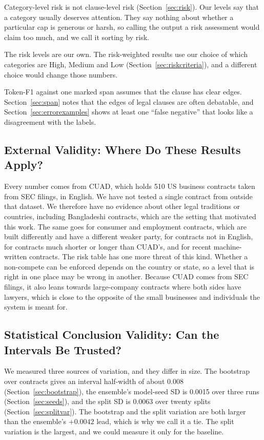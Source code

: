 Category-level risk is not clause-level risk (Section~\ref{sec:risk}). Our levels say that a category usually deserves attention. They say nothing about whether a particular cap is generous or harsh, so calling the output a risk assessment would claim too much, and we call it sorting by risk.

The risk levels are our own. The risk-weighted results use our choice of which categories are High, Medium and Low (Section~\ref{sec:riskcriteria}), and a different choice would change those numbers.

Token-F1 against one marked span assumes that the clause has clear edges. Section~\ref{sec:span} notes that the edges of legal clauses are often debatable, and Section~\ref{sec:errorexamples} shows at least one ``false negative'' that looks like a disagreement with the labels.

\subsection{External Validity: Where Do These Results Apply?}
Every number comes from CUAD, which holds 510 US business contracts taken from SEC filings, in English. We have not tested a single contract from outside that dataset. We therefore have no evidence about other legal traditions or countries, including Bangladeshi contracts, which are the setting that motivated this work. The same goes for consumer and employment contracts, which are built differently and have a different weaker party, for contracts not in English, for contracts much shorter or longer than CUAD's, and for recent machine-written contracts. The risk table has one more threat of this kind. Whether a non-compete can be enforced depends on the country or state, so a level that is right in one place may be wrong in another. Because CUAD comes from SEC filings, it also leans towards large-company contracts where both sides have lawyers, which is close to the opposite of the small businesses and individuals the system is meant for.

\subsection{Statistical Conclusion Validity: Can the Intervals Be Trusted?}
We measured three sources of variation, and they differ in size. The bootstrap over contracts gives an interval half-width of about 0.008 (Section~\ref{sec:bootstrap}), the ensemble's model-seed SD is 0.0015 over three runs (Section~\ref{sec:seeds}), and the split SD is 0.0063 over twenty splits (Section~\ref{sec:splitvar}). The bootstrap and the split variation are both larger than the ensemble's $+0.0042$ lead, which is why we call it a tie. The split variation is the largest, and we could measure it only for the baseline.

